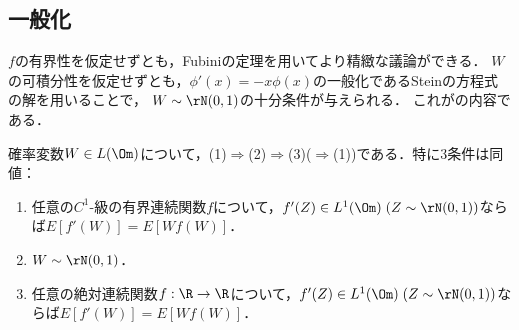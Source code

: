 \documentclass[uplatex,dvipdfmx]{jsreport}
\begin{document}
\subsection{一般化}

\begin{tcolorbox}[colframe=ForestGreen, colback=ForestGreen!10!white,breakable,colbacktitle=ForestGreen!40!white,coltitle=black,fonttitle=\bfseries\sffamily,
title=]
    $f$の有界性を仮定せずとも，Fubiniの定理を用いてより精緻な議論ができる．
    $W$の可積分性を仮定せずとも，$\phi'(x)=-x\phi(x)$の一般化であるSteinの方程式の解を用いることで，
    $W\sim\rN(0,1)$の十分条件が与えられる．
    これが\cite{Stein72-BoundForErrorOfNormalApproximation}の内容である．
\end{tcolorbox}

\begin{lemma}
    確率変数$W\in L(\Om)$について，(1)$\Rightarrow$(2)$\Rightarrow$(3)($\Rightarrow$(1))である．特に3条件は同値：
    \begin{enumerate}
        \item 任意の$C^1$-級の有界連続関数$f$について，$f'(Z)\in L^1(\Om)\;(Z\sim\rN(0,1))$ならば$E[f'(W)]=E[Wf(W)]$．
        \item $W\sim\rN(0,1)$．
        \item 任意の絶対連続関数$f:\R\to\R$について，$f'(Z)\in L^1(\Om)\;(Z\sim\rN(0,1))$ならば$E[f'(W)]=E[Wf(W)]$．
    \end{enumerate}
\end{lemma}
\end{document}

